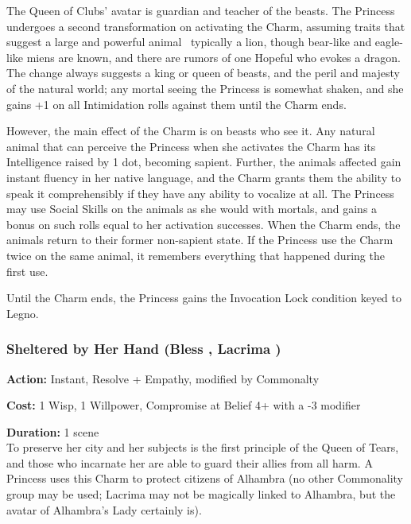 \noindent The Queen of Clubs' avatar is guardian and teacher of the beasts. The Princess undergoes a second transformation on activating the Charm, assuming traits that suggest a large and powerful animal \textendash\, typically a lion, though bear-like and eagle-like miens are known, and there are rumors of one Hopeful who evokes a dragon. The change always suggests a king or queen of beasts, and the peril and majesty of the natural world; any mortal seeing the Princess is somewhat shaken, and she gains +1 on all Intimidation rolls against them until the Charm ends.

However, the main effect of the Charm is on beasts who see it. Any natural animal that can perceive the Princess when she activates the Charm has its Intelligence raised by 1 dot, becoming sapient. Further, the animals affected gain instant fluency in her native language, and the Charm grants them the ability to speak it comprehensibly if they have any ability to vocalize at all. The Princess may use Social Skills on the animals as she would with mortals, and gains a bonus on such rolls equal to her activation successes. When the Charm ends, the animals return to their former non-sapient state. If the Princess use the Charm twice on the same animal, it remembers everything that happened during the first use.

Until the Charm ends, the Princess gains the Invocation Lock condition keyed to Legno.

\subsubsection*{Sheltered by Her Hand (Bless \textbullet\textbullet\textbullet\textbullet\textbullet, Lacrima \textbullet\textbullet\textbullet\textbullet)}

\noindent \textbf{Action:} Instant, Resolve + Empathy, modified by Commonalty

\noindent \textbf{Cost:} 1 Wisp, 1 Willpower, Compromise at Belief 4+ with a -3 modifier

\noindent \textbf{Duration:} 1 scene \\

\noindent To preserve her city and her subjects is the first principle of the Queen of Tears, and those who incarnate her are able to guard their allies from all harm. A Princess uses this Charm to protect citizens of Alhambra (no other Commonality group may be used; Lacrima may not be magically linked to Alhambra, but the avatar of Alhambra's Lady certainly is).

